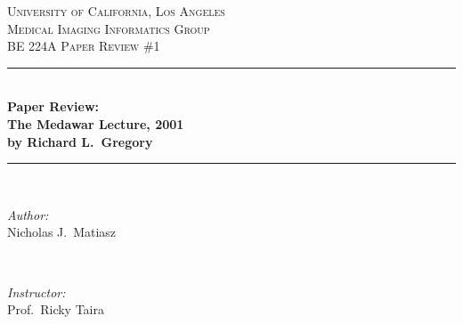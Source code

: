 \documentclass[12pt]{article} %
\begin{document}
\begin{titlepage}

\newcommand{\HRule}{\rule{\linewidth}{0.5mm}} %

\center %
 

\textsc{\Large University of California, Los Angeles}\\[1.5cm] %
\textsc{\large Medical Imaging Informatics Group}\\[0.5cm] %
\textsc{\large BE 224A Paper Review \#{1}}\\[0.5cm] %

\vspace{20pt}
\HRule \\[0.5cm]
\LARGE{\textbf{Paper Review:}}\\[.3cm]
\LARGE{\textbf{The Medawar Lecture, 2001}}\\[.3cm]
\LARGE{\textbf{by Richard L.\ Gregory}}\\
\HRule \\[1.5cm]
 

\begin{minipage}{0.4\textwidth}
\begin{flushleft} \large
\emph{Author:}\\
Nicholas J.\ Matiasz %
\end{flushleft}
\end{minipage}
~
\begin{minipage}{0.4\textwidth}
\begin{flushright} \large
\emph{Instructor:} \\
Prof.\ Ricky Taira %
\end{flushright}
\end{minipage}\\[4cm]


\end{titlepage}
\end{document}
